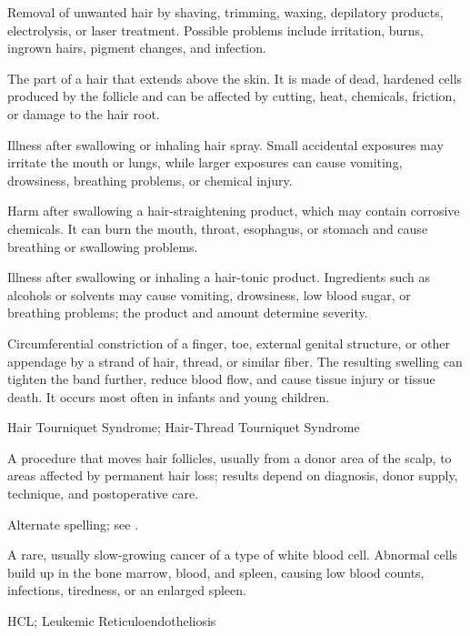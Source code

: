 Removal of unwanted hair by shaving, trimming, waxing, depilatory products, electrolysis, or laser treatment. Possible problems include irritation, burns, ingrown hairs, pigment changes, and infection.

 The part of a hair that extends above the skin. It is made of dead, hardened cells produced by the follicle and can be affected by cutting, heat, chemicals, friction, or damage to the hair root.

 Illness after swallowing or inhaling hair spray. Small accidental exposures may irritate the mouth or lungs, while larger exposures can cause vomiting, drowsiness, breathing problems, or chemical injury.

 Harm after swallowing a hair-straightening product, which may contain corrosive chemicals. It can burn the mouth, throat, esophagus, or stomach and cause breathing or swallowing problems.

 Illness after swallowing or inhaling a hair-tonic product. Ingredients such as alcohols or solvents may cause vomiting, drowsiness, low blood sugar, or breathing problems; the product and amount determine severity.

 Circumferential constriction of a finger, toe, external genital structure, or other appendage by a strand of hair, thread, or similar fiber. The resulting swelling can tighten the band further, reduce blood flow, and cause tissue injury or tissue death. It occurs most often in infants and young children.

\synonyms
Hair Tourniquet Syndrome; Hair-Thread Tourniquet Syndrome

 A procedure that moves hair follicles, usually from a donor area of the scalp, to areas affected by permanent hair loss; results depend on diagnosis, donor supply, technique, and postoperative care.

 Alternate spelling; see .

 A rare, usually slow-growing cancer of a type of white blood cell. Abnormal cells build up in the bone marrow, blood, and spleen, causing low blood counts, infections, tiredness, or an enlarged spleen.

\synonyms
HCL; Leukemic Reticuloendotheliosis


